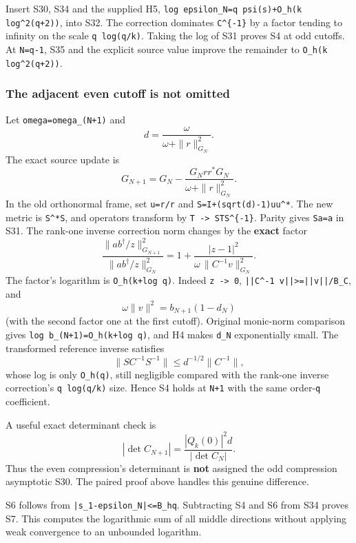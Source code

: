Insert S30, S34 and the supplied H5, \nolinkurl{log epsilon_N=q psi(s)+O_h(k log^2(q+2))}, into S32. The correction dominates \texttt{C\^{}\{-1\}} by a factor tending to infinity on the scale \texttt{q\ log(q/k)}. Taking the log of S31 proves S4 at odd cutoffs. At \texttt{N=q-1}, S35 and the explicit source value improve the remainder to \nolinkurl{O_h(k log^2(q+2))}.

\subsubsection{The adjacent even cutoff is not omitted}\label{the-adjacent-even-cutoff-is-not-omitted}

Let \nolinkurl{omega=omega_(N+1)} and \[
 d=\frac{\omega}{\omega+\|r\|_{G_N}^2}.
\] The exact source update is \[
 G_{N+1}=G_N-\frac{G_Nrr^*G_N}{\omega+\|r\|_{G_N}^2}.              \tag{S36}
\] In the old orthonormal frame, set \texttt{u=r/\textbar{}\textbar{}r\textbar{}\textbar{}} and \nolinkurl{S=I+(sqrt(d)-1)uu^*}. The new metric is \texttt{S\^{}*S}, and operators transform by \texttt{T\ -\textgreater{}\ STS\^{}\{-1\}}. Parity gives \texttt{Sa=a} in S31. The rank-one inverse correction norm changes by the \textbf{exact} factor \[
 \boxed{
 \frac{\|ab^\dagger/z\|_{G_{N+1}}^2}
      {\|ab^\dagger/z\|_{G_N}^2}
 =1+\frac{|z-1|^2}{\omega\,\|C^{-1}v\|_{G_N}^2}.}                \tag{S37}
\] The factor's logarithm is \texttt{O\_h(k+log\ q)}. Indeed \texttt{z\ -\textgreater{}\ 0}, \nolinkurl{||C^-1 v||>=||v||/B_C}, and \[
 \omega\|v\|^2=b_{N+1}(1-d_N)
\] (with the second factor one at the first cutoff). Original monic-norm comparison gives \nolinkurl{log b_(N+1)=O_h(k+log q)}, and H4 makes \texttt{d\_N} exponentially small. The transformed reference inverse satisfies \[
 \|SC^{-1}S^{-1}\|\le d^{-1/2}\|C^{-1}\|,
\] whose log is only \texttt{O\_h(q)}, still negligible compared with the rank-one inverse correction's \texttt{q\ log(q/k)} size. Hence S4 holds at \texttt{N+1} with the same order-\texttt{q} coefficient.

A useful exact determinant check is \[
 \boxed{|\det C_{N+1}|=\frac{|Q_k(0)|^2d}{|\det C_N|}.}           \tag{S38}
\] Thus the even compression's determinant is \textbf{not} assigned the odd compression asymptotic S30. The paired proof above handles this genuine difference.

S6 follows from \nolinkurl{|s_1-epsilon_N|<=B_hq}. Subtracting S4 and S6 from S34 proves S7. This computes the logarithmic sum of all middle directions without applying weak convergence to an unbounded logarithm.

